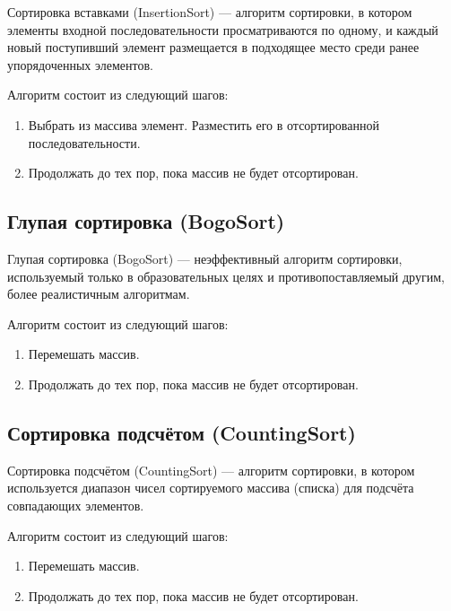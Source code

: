 Сортировка вставками (InsertionSort) --- алгоритм сортировки, 
в котором элементы входной последовательности просматриваются по одному, 
и каждый новый поступивший элемент размещается в подходящее место среди ранее упорядоченных элементов.

Алгоритм состоит из следующий шагов:

\begin{enumerate}
    \item Выбрать из массива элемент.
    Разместить его в отсортированной последовательности.
    \item Продолжать до тех пор, пока массив не будет отсортирован.
\end{enumerate}

\subsection*{Глупая сортировка (BogoSort)}

Глупая сортировка (BogoSort) --- неэффективный алгоритм сортировки, 
используемый только в образовательных целях и противопоставляемый другим, 
более реалистичным алгоритмам.

Алгоритм состоит из следующий шагов:

\begin{enumerate}
    \item Перемешать массив.
    \item Продолжать до тех пор, пока массив не будет отсортирован.
\end{enumerate}

\subsection*{Сортировка подсчётом (CountingSort)}

Сортировка подсчётом (CountingSort) --- алгоритм сортировки, 
в котором используется диапазон чисел сортируемого массива (списка) 
для подсчёта совпадающих элементов.

Алгоритм состоит из следующий шагов:

\begin{enumerate}
    \item Перемешать массив.
    \item Продолжать до тех пор, пока массив не будет отсортирован.
\end{enumerate}
